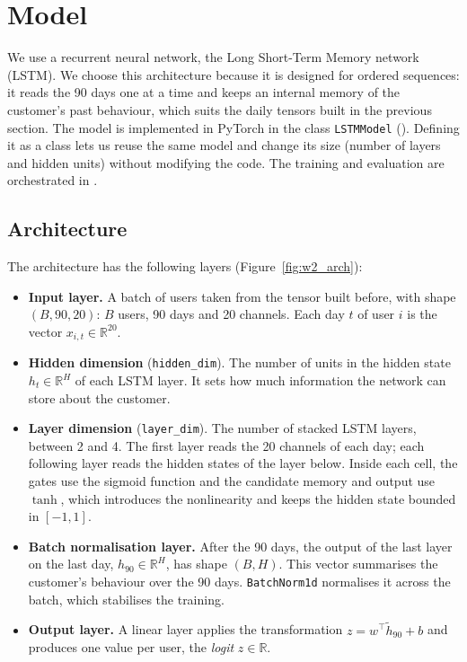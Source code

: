 \documentclass{article}
\newcommand{\R}{\mathbb{R}}
\begin{document}
\section{Model}

We use a recurrent neural network, the Long Short-Term Memory network (LSTM). We choose this architecture because it is designed for ordered sequences: it reads the 90 days one at a time and keeps an internal memory of the customer's past behaviour, which suits the daily tensors built in the previous section. The model is implemented in PyTorch in the class \texttt{LSTMModel} (). Defining it as a class lets us reuse the same model and change its size (number of layers and hidden units) without modifying the code. The training and evaluation are orchestrated in .

\subsection{Architecture}

The architecture has the following layers (Figure~\ref{fig:w2_arch}):

\begin{itemize}
    \item \textbf{Input layer.} A batch of users taken from the tensor built before, with shape $(B, 90, 20)$: $B$ users, 90 days and 20 channels. Each day $t$ of user $i$ is the vector $x_{i,t} \in \R^{20}$.
    \item \textbf{Hidden dimension} (\texttt{hidden\_dim}). The number of units in the hidden state $h_t \in \R^{H}$ of each LSTM layer. It sets how much information the network can store about the customer.
    \item \textbf{Layer dimension} (\texttt{layer\_dim}). The number of stacked LSTM layers, between 2 and 4. The first layer reads the 20 channels of each day; each following layer reads the hidden states of the layer below. Inside each cell, the gates use the sigmoid function and the candidate memory and output use $\tanh$, which introduces the nonlinearity and keeps the hidden state bounded in $[-1, 1]$.
    \item \textbf{Batch normalisation layer.} After the 90 days, the output of the last layer on the last day, $h_{90} \in \R^{H}$, has shape $(B, H)$. This vector summarises the customer's behaviour over the 90 days. \texttt{BatchNorm1d} normalises it across the batch, which stabilises the training.
    \item \textbf{Output layer.} A linear layer applies the transformation $z = w^\top \tilde{h}_{90} + b$ and produces one value per user, the \emph{logit} $z \in \R$.
\end{itemize}
\end{document}
